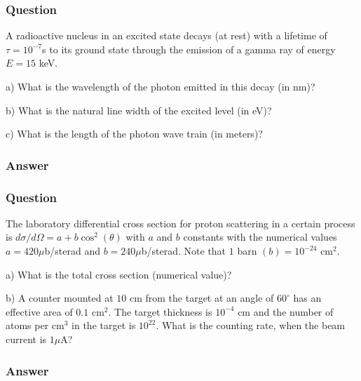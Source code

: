 \subsubsection{Question}
A radioactive nucleus in an excited state decays (at rest) with a lifetime of ${\tau} = 10^{-7}$s to its ground state through the emission of a gamma ray of energy $E = 15$ keV.

a) What is the wavelength of the photon emitted in this decay (in nm)?

b) What is the natural line width of the excited level (in eV)?

c) What is the length of the photon wave train (in meters)?
\subsubsection{Answer}


\subsubsection{Question}
The laboratory differential cross section for proton scattering in a certain process is $d{\sigma}/d{\Omega} = a + b\cos^2(\theta)$ with $a$ and $b$ constants with the numerical values $a = 420\mu$b/sterad and $b = 240\mu$b/sterad. Note that $1$ barn $(b) = 10^{-24}$ cm$^2$.

a) What is the total cross section (numerical value)?

b) A counter mounted at $10$ cm from the target at an angle of $60^\circ$ has an effective area of $0.1$ cm$^2$. The target thickness is $10^{-4}$ cm and the number of atoms per cm$^3$ in the target is $10^{22}$. What is the counting rate, when the beam current is $1\mu$A?
\subsubsection{Answer}

